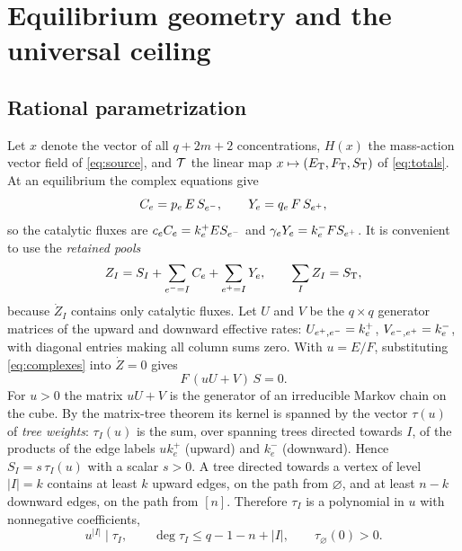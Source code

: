 \section{Equilibrium geometry and the universal ceiling}\label{sec:geometry}

\subsection{Rational parametrization}
Let \(x\) denote the vector of all \(q+2m+2\) concentrations, \(H(x)\) the mass-action vector
field of \eqref{eq:source}, and \(\mathcal T\) the linear map \(x\mapsto(E_{\mathrm T},F_{\mathrm T},S_{\mathrm T})\) of
\eqref{eq:totals}. At an equilibrium the complex equations give
\begin{equation}\label{eq:complexes}
 C_e=p_e\,E\,S_{e^{-}},\qquad Y_e=q_e\,F\,S_{e^{+}},
\end{equation}
so the catalytic fluxes are \(c_eC_e=k_e^+ES_{e^{-}}\) and \(\gamma_eY_e=k_e^-FS_{e^{+}}\). It
is convenient to use the \emph{retained pools}
\begin{equation}\label{eq:pools}
 Z_I=S_I+\sum_{e^{-}=I}C_e+\sum_{e^{+}=I}Y_e ,\qquad \sum_IZ_I=S_{\mathrm T} ,
\end{equation}
because \(\dot Z_I\) contains only catalytic fluxes. Let \(U\) and \(V\) be the \(q\times q\)
generator matrices of the upward and downward effective rates: \(U_{e^{+},e^{-}}=k_e^+\),
\(V_{e^{-},e^{+}}=k_e^-\), with diagonal entries making all column sums zero. With \(u=E/F\),
substituting \eqref{eq:complexes} into \(\dot Z=0\) gives
\begin{equation}\label{eq:frozen}
 F\,(uU+V)\,S=0 .
\end{equation}
For \(u>0\) the matrix \(uU+V\) is the generator of an irreducible Markov chain on the cube.
By the matrix-tree theorem \cite{MirzaevGunawardena2013,ThomsonGunawardena2009b} its kernel is
spanned by the vector \(\tau(u)\) of \emph{tree weights}: \(\tau_I(u)\) is the sum, over
spanning trees directed towards \(I\), of the products of the edge labels \(uk_e^+\) (upward)
and \(k_e^-\) (downward). Hence \(S_I=s\,\tau_I(u)\) with a scalar \(s>0\). A tree directed
towards a vertex of level \(|I|=k\) contains at least \(k\) upward edges, on the path from
\(\varnothing\), and at least \(n-k\) downward edges, on the path from \([n]\). Therefore
\(\tau_I\) is a polynomial in \(u\) with nonnegative coefficients,
\begin{equation}\label{eq:degrees}
 u^{|I|}\mid\tau_I,\qquad \deg\tau_I\le q-1-n+|I| ,\qquad \tau_\varnothing(0)>0 .
\end{equation}
